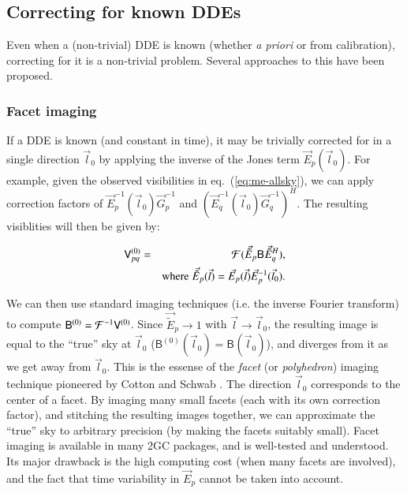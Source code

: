 \documentclass[]{aa}
\newcommand{\herm}{H}
\newcommand{\jones}[2]{\vec {#1}_{#2}}
\newcommand{\jonesinv}[2]{\vec {#1}^{-1}_{#2}}
\newcommand{\jonesT}[2]{\vec {#1}^{\herm}_{#2}}
\newcommand{\coh}[2]{\mathsf{{#1}}_{{#2}}}
\begin{document}
\subsection{Correcting for known DDEs\label{sec:dde-correction}}

Even when a (non-trivial) DDE is known (whether \emph{a priori} or from calibration), correcting for it is a non-trivial problem. Several approaches to this have been proposed.

\subsubsection{Facet imaging}

If a DDE is known (and constant in time), it may be trivially corrected for in a single direction $\vec l_0$ by applying the inverse of the Jones term $\jones{E}{p}(\vec l_0)$. For example, given the observed visibilities in eq.~(\ref{eq:me-allsky}), we can apply correction factors of $\jonesinv{E}{p}(\vec l_0)\jonesinv{G}{p}$ and $(\jonesinv{E}{q}(\vec l_0)\jonesinv{G}{q})^{\herm}$. The resulting visiblities will then be given by:

\begin{eqnarray*}
\coh{V}{pq}^{(0)} & = & {\cal F}( \jones{\tilde E}{p} \coh{B}{} \jonesT{\tilde E}{q} ), \\
 & & \mathrm{where} \; \jones{\tilde E}{p}(\vec l) = \jones{E}{p}(\vec l)\jonesinv{E}{p}(\vec l_0).
\end{eqnarray*}

We can then use standard imaging techniques (i.e. the inverse Fourier transform) to compute $\coh{B}{}^{(0)} = {\cal F}^{-1}\coh{V}{}^{(0)}$. Since $\jones{\tilde E}{p}\to1$ with $\vec l \to \vec l_0$, the resulting image is equal to the ``true'' sky at $\vec l_0$  ($\coh{B}{}^{(0)}(\vec l_0) =  \coh{B}{}(\vec l_0)$), and diverges from it as we get away from $\vec l_0$. This is the essense of the \emph{facet} (or \emph{polyhedron}) imaging technique pioneered by Cotton and Schwab \citep[for an overview, see][]{faceting}. The direction $\vec l_0$ corresponds to the center of a facet. By imaging many small facets (each with its own correction factor), and stitching the resulting images together, we can approximate the ``true'' sky to arbitrary precision (by making the facets suitably small). Facet imaging is available in many 2GC packages, and is well-tested and understood. Its major drawback is the high computing cost (when many facets are involved), and the fact that time variability in $\jones{E}{p}$ cannot be taken into account. 
\end{document}
